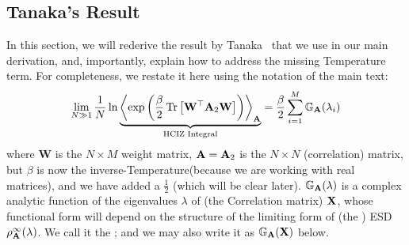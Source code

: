 \subsection{Tanaka's Result}
\label{sxn:tanaka}

In this section, we will rederive the result by Tanaka~\cite{Tanaka2007,Tanaka2008} that we use in our main derivation,
and, importantly, explain how to address the missing Temperature term.
For completeness, we restate it here using the notation of the main text:
\begin{equation}
  \label{eqn:hciz}
  \lim_{N \gg 1} \frac{1}{N} \ln 
\underbrace{
  \Expected[\mathbf{\AMAT}]{
    \exp\left(\frac{\beta}{2}
    \Trace{\mathbf{W}^{\top} \AMAT_{2} \mathbf{W}}
    \right)
  }
 }_{\text{HCIZ Integral}}
  = \frac{\beta}{2} \sum_{i=1}^{M} \GNORM(\lambda_{i})
\end{equation}
where 
$\mathbf{W}$ is the $N\times M$ \Teacher weight matrix, 
$\mathbf{A}=\mathbf{A}_{2}$ is the $N\times N$ \Student (correlation) matrix, 
but $\beta$ is now the inverse-Temperature(because we are working with real matrices),
and we have added a $\tfrac{1}{2}$ (which will be clear later).
$\mathbb{G}_{\mathbf{A}}(\lambda)$ is a complex analytic function of the eigenvalues $\lambda$ of (the \Teacher Correlation matrix) $\mathbf{X}$, 
whose functional form will depend on the structure of the limiting form of (the \Student) ESD $\rho_{\mathbf{A}}^{\infty}(\lambda)$.
We call it the \emph{ \GeneratingFunction};
and we may also write it as $\mathbb{G}_{\mathbf{A}}(\mathbf{X})$ below.

